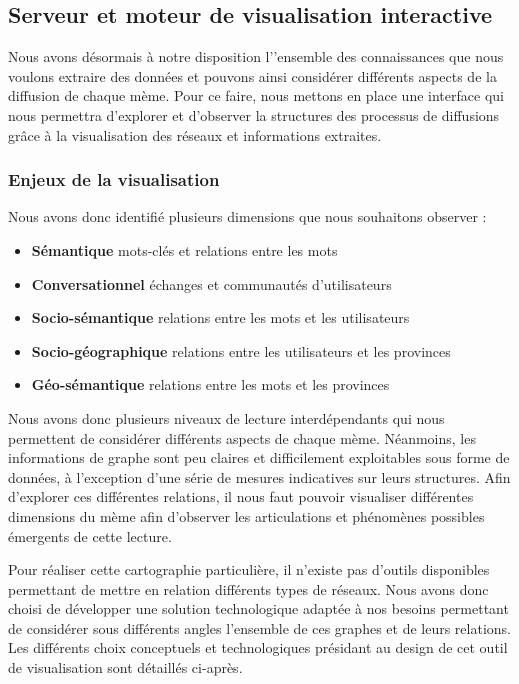 \subsection{Serveur et moteur de visualisation interactive}

Nous avons désormais à notre disposition l'{\textquoteright}ensemble des connaissances que nous voulons extraire des données et pouvons ainsi considérer différents aspects de la diffusion de chaque  mème. Pour ce faire, nous mettons en place une interface qui nous permettra d'explorer et d'observer la structures des processus de diffusions grâce à la visualisation des réseaux et informations extraites.

\subsubsection{Enjeux de la visualisation} %
\label{ssub:enjeux_de_la_visualisation}

Nous avons donc identifié plusieurs dimensions que nous souhaitons observer :

\begin{itemize}
    \item \textbf{Sémantique} mots-clés et relations entre les mots
    \item \textbf{Conversationnel} échanges et communautés d{\textquoteright}utilisateurs 
    \item \textbf{Socio-sémantique} relations entre les mots et les utilisateurs
    \item \textbf{Socio-géographique} relations entre les utilisateurs et les provinces
    \item \textbf{Géo-sémantique} relations entre les mots et les provinces
\end{itemize}

Nous avons donc plusieurs niveaux de lecture interdépendants qui nous permettent de considérer différents aspects de chaque mème. Néanmoins, les informations de graphe sont peu claires et difficilement exploitables sous forme de données, à l{\textquoteright}exception d{\textquoteright}une série de mesures indicatives sur leurs structures. Afin d{\textquoteright}explorer ces différentes relations, il nous faut pouvoir visualiser différentes dimensions du mème afin d{\textquoteright}observer les articulations et phénomènes possibles émergents de cette lecture. 

Pour réaliser cette cartographie particulière, il n{\textquoteright}existe pas d{\textquoteright}outils disponibles permettant de mettre en relation différents types de réseaux. Nous avons donc choisi de développer une solution technologique adaptée à nos besoins permettant de considérer sous différents angles l{\textquoteright}ensemble de ces graphes et de leurs relations. Les différents choix conceptuels et technologiques présidant au design de cet outil de visualisation sont détaillés ci-après. 

